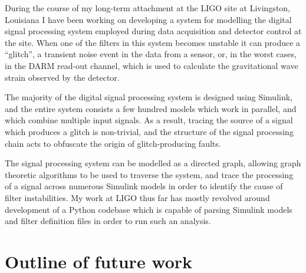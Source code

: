 \documentclass[openleft]{kentigern}
\theoremstyle{definition}
\begin{document}
During the course of my long-term attachment at the LIGO site at
Livingston, Louisiana I have been working on developing a system for
modelling the digital signal processing system employed during data
acquisition and detector control at the site. When one of the filters
in this system becomes unstable it can produce a ``glitch'', a
transient noise event in the data from a sensor, or, in the worst
cases, in the DARM read-out channel, which is used to calculate the
gravitational wave strain observed by the detector.

The majority of the digital signal processing system is designed using
Simulink, and the entire system consists a few hundred models which
work in parallel, and which combine multiple input signals. As a
result, tracing the source of a signal which produces a glitch is
non-trivial, and the structure of the signal processing chain acts to
obfuscate the origin of glitch-producing faults.

The signal processing system can be modelled as a directed graph,
allowing graph theoretic algorithms to be used to traverse the system,
and trace the processing of a signal across numerous Simulink models
in order to identify the cause of filter instabilities. My work at
LIGO thus far has mostly revolved around development of a Python
codebase which is capable of parsing Simulink models and filter
definition files in order to run such an analysis.


\appendices

\chapter{Outline of future work}
\label{part:future}

\backmatter






%

\glsaddall
{}
\printglossaries
\end{document}
